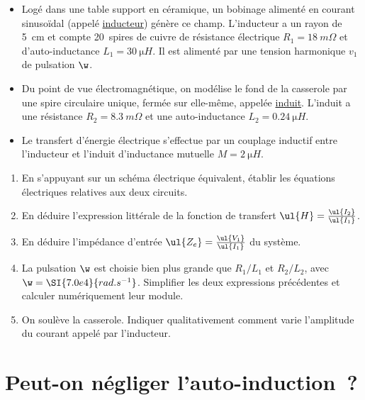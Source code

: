 \documentclass[a4paper, 10pt, final, garamond]{book}
\begin{document}
\begin{itemize}[label=$\diamond$, leftmargin=10pt]
	\item Logé dans une table support en céramique, un bobinage alimenté en
	      courant sinusoïdal (appelé \ul{inducteur}) génère ce champ. L'inducteur a un
	      rayon de \SI{5}{cm} et compte \SI{20}{spires} de cuivre de résistance
	      électrique $R_1 = \SI{18}{m\Omega}$ et d'auto-inductance $L_1 =
		      \SI{30}{\micro H}$. Il est alimenté par une tension harmonique $v_1$ de
	      pulsation $\w$.
	\item Du point de vue électromagnétique, on modélise le fond de la casserole
	      par une spire circulaire unique, fermée sur elle-même, appelée \ul{induit}.
	      L'induit a une résistance $R_2 = \SI{8.3}{m\Omega}$ et une auto-inductance
	      $L_2 = \SI{0.24}{\micro H}$.
	\item Le transfert d'énergie électrique s'effectue par un couplage inductif
	      entre l'inducteur et l'induit d'inductance mutuelle $M = \SI{2}{\micro H}$.
\end{itemize}

\begin{enumerate}
	\item En s'appuyant sur un schéma électrique équivalent, établir les équations
	      électriques relatives aux deux circuits.
	\item En déduire l'expression littérale de la fonction de transfert $\ul{H} =
		      \frac{\ul{I_2}}{\ul{I_1}}$.
	\item En déduire l'impédance d'entrée $\ul{Z_e} = \frac{\ul{V_1}}{\ul{I_1}}$
	      du système.
	\item La pulsation $\w$ est choisie bien plus grande que $R_1/L_1$ et
	      $R_2/L_2$, avec $\w = \SI{7.0e4}{rad.s^{-1}}$. Simplifier les deux
	      expressions précédentes et calculer numériquement leur module.
	\item On soulève la casserole. Indiquer qualitativement comment varie
	      l'amplitude du courant appelé par l'inducteur.
\end{enumerate}

\section{Peut-on négliger l'auto-induction~?}
\label{sec:neglautoind}
\end{document}
